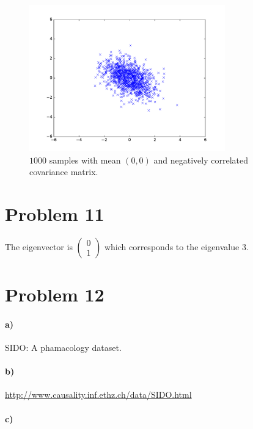 \documentclass[12pt]{article}
\begin{document}
\begin{figure}[H]
        \begin{center}
                \includegraphics[height=2.5in]{Problem10-e}
                \caption{\(1000\) samples with mean \((0,0)\) and negatively correlated covariance matrix.}
        \end{center}
\end{figure}

\section*{Problem 11}

The eigenvector is \(\left(\begin{matrix}0\\1\end{matrix}\right)\) which corresponds to the eigenvalue \(3\).

\section*{Problem 12}

\paragraph{a)}

SIDO: A phamacology dataset.

\paragraph{b)}

\href{http://www.causality.inf.ethz.ch/data/SIDO.html}{http://www.causality.inf.ethz.ch/data/SIDO.html}

\paragraph{c)}
\end{document}
